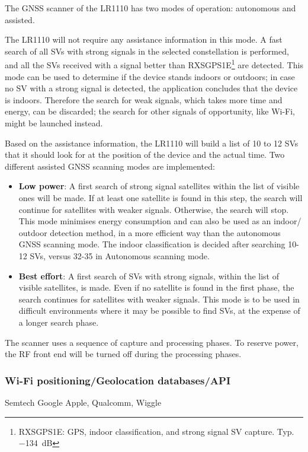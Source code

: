 The \ac{GNSS} scanner of the LR1110 has two modes of operation: autonomous and assisted.

The LR1110 will not require any assistance information in this mode. A fast search of all \ac{SV}s with strong signals in the
selected constellation is performed, and all the \ac{SV}s received with a signal better than RXSGPS1E\footnote{RXSGPS1E: GPS, indoor classification, and strong signal \ac{SV} capture. Typ. \SI{-134}{\dB}\cite{LR1110_datasheet}} are detected.
This mode can be used to determine if the device stands indoors or outdoors; in case no \ac{SV} with a strong signal is detected, the application concludes that the device is indoors. Therefore the search for weak signals, which takes more time and energy, can be discarded; the search for other signals of opportunity, like Wi-Fi, might be launched instead.

Based on the assistance information, the LR1110 will build a list of 10 to 12 \ac{SV}s that it should look for at the position of the device and the actual time.
Two different assisted \ac{GNSS} scanning modes are implemented:
\begin{itemize}
\item \textbf{Low power}: A first search of strong signal satellites within the list of visible ones will be made. If at least one satellite is found in this step, the search will continue for satellites with weaker signals. Otherwise, the search will stop. This mode minimises energy consumption and can also be used as an indoor/ outdoor detection method, in a more efficient way than the autonomous \ac{GNSS} scanning mode. The indoor classification is decided after searching 10-12 \ac{SV}s, versus 32-35 in Autonomous scanning mode.
\item \textbf{Best effort}: A first search of \ac{SV}s with strong signals, within the list of visible satellites, is made. Even if no satellite is found in the first phase, the search continues for satellites with weaker signals. This mode is to be used in difficult environments where it may be possible to find \ac{SV}s, at the expense of a longer search phase.
\end{itemize}
The scanner uses a sequence of capture and processing phases. To reserve power, the \ac{RF} front end will be turned off during the processing phases.

\subsubsection{Wi-Fi positioning/Geolocation databases/API}
Semtech
Google
Apple, Qualcomm, Wiggle

